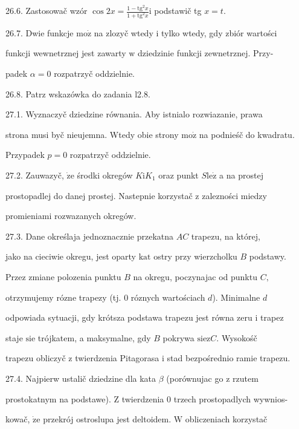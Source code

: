 \documentclass[a4paper,12pt]{article}
\begin{document}
26.6. Zastosowač wzór $\displaystyle \cos 2x=\frac{1-\mathrm{t}\mathrm{g}^{2}x}{1+\mathrm{t}\mathrm{g}^{2}x}\mathrm{i}$ podstawič tg $x=t.$

26.7. Dwie funkcje $\mathrm{m}\mathrm{o}\dot{\mathrm{z}}$ na zlozyč wtedy $\mathrm{i}$ tylko wtedy, gdy zbiór wartości

funkcji wewnetrznej jest zawarty $\mathrm{w}$ dziedzinie funkcji zewnetrznej. Przy-

padek $\alpha=0$ rozpatrzyč oddzielnie.

26.8. Patrz wskazówka do zadania l2.8.

27.1. Wyznaczyč dziedzine równania. Aby istnialo rozwiazanie, prawa

strona musi byč nieujemna. Wtedy obie strony $\mathrm{m}\mathrm{o}\dot{\mathrm{z}}$ na podnieśč do kwadratu.

Przypadek $p=0$ rozpatrzyč oddzielnie.

27.2. Zauwazyč, $\dot{\mathrm{z}}\mathrm{e}$ środki okregów $K\mathrm{i}K_{1}$ oraz punkt $S\mathrm{l}\mathrm{e}\dot{\mathrm{z}}$ a na prostej

prostopadlej do danej prostej. Nastepnie korzystač $\mathrm{z}$ zalezności miedzy

promieniami rozwazanych okregów.

27.3. Dane określaja jednoznacznie przekatna $AC$ trapezu, na której,

jako na cieciwie okregu, jest oparty $\mathrm{k}\mathrm{a}\mathrm{t}$ ostry przy wierzcholku $B$ podstawy.

Przez zmiane polozenia punktu $B$ na okregu, poczynajac od punktu $C,$

otrzymujemy rózne trapezy (tj. $0$ róznych wartościach $d$). Minimalne $d$

odpowiada sytuacji, gdy krótsza podstawa trapezu jest równa zeru $\mathrm{i}$ trapez

staje $\mathrm{s}\mathrm{i}\mathrm{e}$ trójkatem, a maksymalne, gdy $B$ pokrywa $\mathrm{s}\mathrm{i}\mathrm{e} \mathrm{z} C$. Wysokośč

trapezu obliczyč $\mathrm{z}$ twierdzenia Pitagorasa $\mathrm{i}$ stad bezpośrednio ramie trapezu.

27.4. Najpierw ustalič dziedzine dla kata $\beta$ (porównujac go $\mathrm{z}$ rzutem

prostokatnym na podstawe). $\mathrm{Z}$ twierdzenia $0$ trzech prostopadlych wywnios-

kowač, $\dot{\mathrm{z}}\mathrm{e}$ przekrój ostroslupa jest deltoidem. $\mathrm{W}$ obliczeniach korzystač
\end{document}
